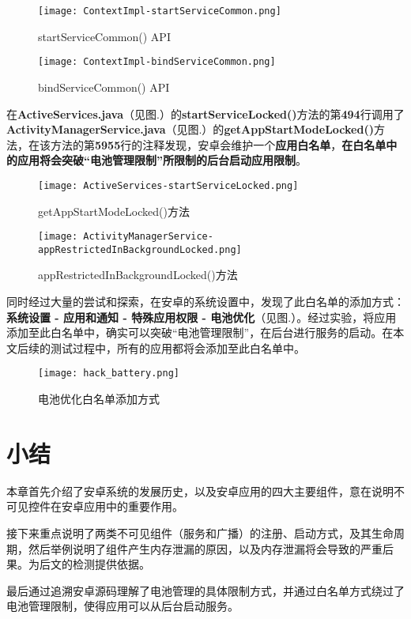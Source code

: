 \begin{figure}[htbp]
	\centering
	\texttt{[image: ContextImpl-startServiceCommon.png]} %
	\caption{startServiceCommon() API}
	\label{fig:source code:startServiceCommon}
\end{figure}


\begin{figure}[htbp]
	\centering
	\texttt{[image: ContextImpl-bindServiceCommon.png]} %
	\caption{bindServiceCommon() API}
	\label{fig:source code:bindServiceCommon}
\end{figure}

在\textbf{ActiveServices.java}（见图.\redbf{\ref{fig:source code:getAppStartModeLocked}}）的\textbf{startServiceLocked()}方法的第\textbf{494}行调用了\textbf{ActivityManagerService.java}（见图.\redbf{\ref{fig:source code:appRestrictedInBackgroundLocked}}）的\textbf{getAppStartModeLocked()}方法，在该方法的第\textbf{5955}行的注释发现，安卓会维护一个\textbf{应用白名单}，\textbf{在白名单中的应用将会突破“电池管理限制”所限制的后台启动应用限制}。

\begin{figure}[htbp]
	\centering
	\texttt{[image: ActiveServices-startServiceLocked.png]} %
	\caption{getAppStartModeLocked()方法}
	\label{fig:source code:getAppStartModeLocked}
\end{figure}

\begin{figure}[htbp]
	\centering
	\texttt{[image: ActivityManagerService-appRestrictedInBackgroundLocked.png]} %
	\caption{appRestrictedInBackgroundLocked()方法}
	\label{fig:source code:appRestrictedInBackgroundLocked}
\end{figure}

同时经过大量的尝试和探索，在安卓的系统设置中，发现了此白名单的添加方式：\textbf{系统设置 - 应用和通知 - 特殊应用权限 - 电池优化}（见图.\redbf{\ref{fig:hack-battery}}）。经过实验，将应用添加至此白名单中，确实可以突破“电池管理限制”，在后台进行服务的启动。在本文后续的测试过程中，所有的应用都将会添加至此白名单中。

\begin{figure}[htbp]
	\centering
	\texttt{[image: hack\_battery.png]} %
	\caption{电池优化白名单添加方式}
	\label{fig:hack-battery}
\end{figure}

\section{小结}

本章首先介绍了安卓系统的发展历史，以及安卓应用的四大主要组件，意在说明不可见控件在安卓应用中的重要作用。

接下来重点说明了两类不可见组件（服务和广播）的注册、启动方式，及其生命周期，然后举例说明了组件产生内存泄漏的原因，以及内存泄漏将会导致的严重后果。为后文的检测提供依据。

最后通过追溯安卓源码理解了电池管理的具体限制方式，并通过白名单方式绕过了电池管理限制，使得应用可以从后台启动服务。